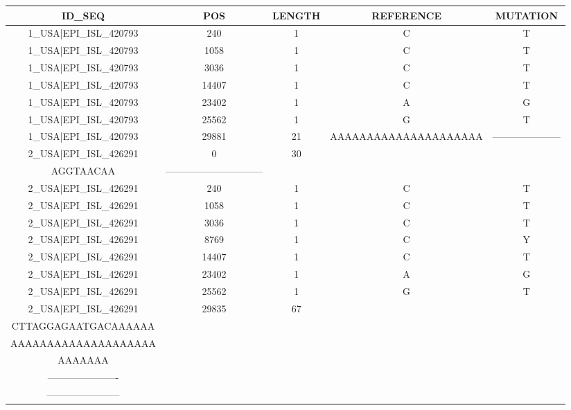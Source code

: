 \documentclass[a4paper,10pt]{article}
\begin{document}
\setlength\LTleft{-2.6 cm}
\begin{longtable}{@{}ccccc@{}}
\toprule
\textbf{ID\_SEQ} & \textbf{POS} & \textbf{LENGTH} & \textbf{REFERENCE} & \textbf{MUTATION} \\* \midrule
\endfirsthead
%
\cline{1-5}
\endhead
%
1\_USA|EPI\_ISL\_420793 & 240 & 1 & C & T \\* \midrule
1\_USA|EPI\_ISL\_420793 & 1058 & 1 & C & T \\* \midrule
1\_USA|EPI\_ISL\_420793 & 3036 & 1 & C & T \\* \midrule
1\_USA|EPI\_ISL\_420793 & 14407 & 1 & C & T \\* \midrule
1\_USA|EPI\_ISL\_420793 & 23402 & 1 & A & G \\* \midrule
1\_USA|EPI\_ISL\_420793 & 25562 & 1 & G & T \\* \midrule
1\_USA|EPI\_ISL\_420793 & 29881 & 21 & AAAAAAAAAAAAAAAAAAAAA & --------------------- \\* \midrule
2\_USA|EPI\_ISL\_426291 & 0 & 30 & \begin{tabular}[c]{@{}c@{}}ATTAAAGGTTTATACCTTCCC\\ AGGTAACAA\end{tabular} & ------------------------------ \\* \midrule
2\_USA|EPI\_ISL\_426291 & 240 & 1 & C & T \\* \midrule
2\_USA|EPI\_ISL\_426291 & 1058 & 1 & C & T \\* \midrule
2\_USA|EPI\_ISL\_426291 & 3036 & 1 & C & T \\* \midrule
2\_USA|EPI\_ISL\_426291 & 8769 & 1 & C & Y \\* \midrule
2\_USA|EPI\_ISL\_426291 & 14407 & 1 & C & T \\* \midrule
2\_USA|EPI\_ISL\_426291 & 23402 & 1 & A & G \\* \midrule
2\_USA|EPI\_ISL\_426291 & 25562 & 1 & G & T \\* \midrule
2\_USA|EPI\_ISL\_426291 & 29835 & 67 & \begin{tabular}[c]{@{}c@{}}CCATGTGATTTTAATAGCTT\\ CTTAGGAGAATGACAAAAAA \\AAAAAAAAAAAAAAAAAAAA \\ AAAAAAA\end{tabular} & \begin{tabular}[c]{@{}c@{}}----------------------\\ ----------------------\\ -----------------------\end{tabular} \\* \midrule

\end{longtable}
\end{document}
